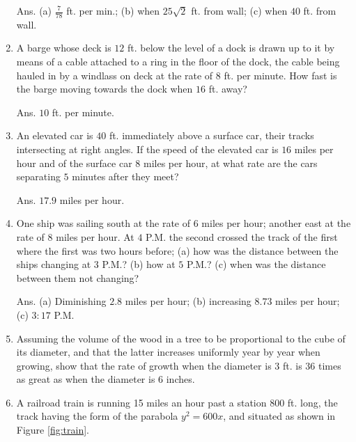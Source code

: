 \begin{enumerate}
Ans. (a) $\frac{7}{78}$ ft. per min.; 
(b) when $25 \sqrt{2}$ ft. from wall; 
(c) when $40$ ft. from wall.

\item
A barge whose deck is $12$ ft. below the level of a dock is drawn 
up to it by means of a cable attached to a ring in the 
floor of the dock, the cable being hauled in by a windlass 
on deck at the rate of $8$ ft. per minute. 
How fast is the barge moving towards the dock when $16$ ft. away? 

Ans. $10$ ft. per minute.

\item
An elevated car is $40$ ft. immediately above a surface car, their 
tracks intersecting at right angles. If the speed of the elevated 
car is $16$ miles per hour and of the surface car $8$ miles per hour, 
at what rate are the cars separating $5$ minutes after they meet? 

Ans. $17.9$ miles per hour.

\item
One ship was sailing south at the rate of $6$ miles per hour; another 
east at the rate of $8$ miles per hour. At $4$ P.M. the second 
crossed the track of the first where the first was two hours 
before; (a) how was the distance between the ships changing 
at $3$ P.M.? (b) how at $5$ P.M.? (c) when was the distance between 
them not changing? 

Ans. (a) Diminishing $2.8$ miles per hour; 
(b) increasing $8.73$ miles per hour; (c) $3: 17$ P.M.

\item
Assuming the volume of the wood in a tree to be proportional 
to the cube of its diameter, and that the latter increases 
uniformly year by year when growing, show that the rate of growth 
when the diameter is $3$ ft. is $36$ times as great as when the 
diameter is $6$ inches.

\item
A railroad train is running 15 miles an hour past a station 
$800$ ft. long, the track having the form of the parabola
$ y^2 = 600x$,
and situated as shown in Figure \ref{fig:train}. 


\end{enumerate}
